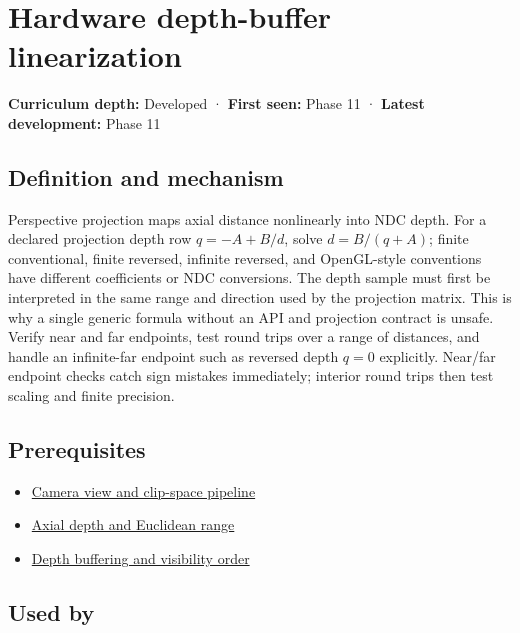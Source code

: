 \hypertarget{appendix-1bc40b08db4a}{}\label{referencestart:appendix-1bc40b08db4a}
\section{Hardware depth-buffer linearization}\label{appendix-1bc40b08db4a-hardware-depth-buffer-linearization}

\textbf{Curriculum depth:} Developed · \textbf{First seen:} Phase 11 · \textbf{Latest development:} Phase 11

\subsection{Definition and mechanism}\label{appendix-1bc40b08db4a-definition-and-mechanism}

Perspective projection maps axial distance nonlinearly into NDC depth. For a declared projection depth row \(q=-A+B/d\), solve \(d=B/(q+A)\); finite conventional, finite reversed, infinite reversed, and OpenGL-style conventions have different coefficients or NDC conversions. The depth sample must first be interpreted in the same range and direction used by the projection matrix. This is why a single generic formula without an API and projection contract is unsafe. Verify near and far endpoints, test round trips over a range of distances, and handle an infinite-far endpoint such as reversed depth \(q=0\) explicitly. Near/far endpoint checks catch sign mistakes immediately; interior round trips then test scaling and finite precision.

\subsection{Prerequisites}\label{appendix-1bc40b08db4a-prerequisites}

\begin{itemize}
\tightlist
\item
  \hyperref[appendix-1c07d64f5e70]{Camera view and clip-space pipeline}
\item
  \hyperref[appendix-cac01ebeeb11]{Axial depth and Euclidean range}
\item
  \hyperref[appendix-97578ed97952]{Depth buffering and visibility order}
\end{itemize}

\subsection{Used by}\label{appendix-1bc40b08db4a-used-by}

